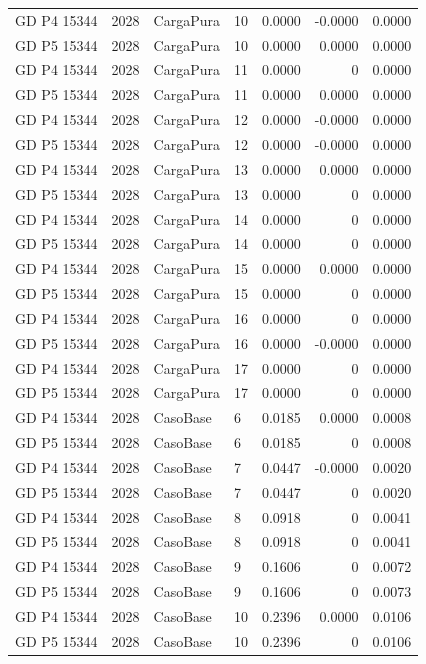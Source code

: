 \documentclass[11pt,a4paper]{article}
\begin{document}
\begin{longtable}{llllrrr}
GD P4 15344 & 2028 & CargaPura & 10 & 0.0000 & -0.0000 & 0.0000 \\
GD P5 15344 & 2028 & CargaPura & 10 & 0.0000 & 0.0000 & 0.0000 \\
GD P4 15344 & 2028 & CargaPura & 11 & 0.0000 & 0 & 0.0000 \\
GD P5 15344 & 2028 & CargaPura & 11 & 0.0000 & 0.0000 & 0.0000 \\
GD P4 15344 & 2028 & CargaPura & 12 & 0.0000 & -0.0000 & 0.0000 \\
GD P5 15344 & 2028 & CargaPura & 12 & 0.0000 & -0.0000 & 0.0000 \\
GD P4 15344 & 2028 & CargaPura & 13 & 0.0000 & 0.0000 & 0.0000 \\
GD P5 15344 & 2028 & CargaPura & 13 & 0.0000 & 0 & 0.0000 \\
GD P4 15344 & 2028 & CargaPura & 14 & 0.0000 & 0 & 0.0000 \\
GD P5 15344 & 2028 & CargaPura & 14 & 0.0000 & 0 & 0.0000 \\
GD P4 15344 & 2028 & CargaPura & 15 & 0.0000 & 0.0000 & 0.0000 \\
GD P5 15344 & 2028 & CargaPura & 15 & 0.0000 & 0 & 0.0000 \\
GD P4 15344 & 2028 & CargaPura & 16 & 0.0000 & 0 & 0.0000 \\
GD P5 15344 & 2028 & CargaPura & 16 & 0.0000 & -0.0000 & 0.0000 \\
GD P4 15344 & 2028 & CargaPura & 17 & 0.0000 & 0 & 0.0000 \\
GD P5 15344 & 2028 & CargaPura & 17 & 0.0000 & 0 & 0.0000 \\
GD P4 15344 & 2028 & CasoBase & 6 & 0.0185 & 0.0000 & 0.0008 \\
GD P5 15344 & 2028 & CasoBase & 6 & 0.0185 & 0 & 0.0008 \\
GD P4 15344 & 2028 & CasoBase & 7 & 0.0447 & -0.0000 & 0.0020 \\
GD P5 15344 & 2028 & CasoBase & 7 & 0.0447 & 0 & 0.0020 \\
GD P4 15344 & 2028 & CasoBase & 8 & 0.0918 & 0 & 0.0041 \\
GD P5 15344 & 2028 & CasoBase & 8 & 0.0918 & 0 & 0.0041 \\
GD P4 15344 & 2028 & CasoBase & 9 & 0.1606 & 0 & 0.0072 \\
GD P5 15344 & 2028 & CasoBase & 9 & 0.1606 & 0 & 0.0073 \\
GD P4 15344 & 2028 & CasoBase & 10 & 0.2396 & 0.0000 & 0.0106 \\
GD P5 15344 & 2028 & CasoBase & 10 & 0.2396 & 0 & 0.0106 \\

\end{longtable}
\end{document}
